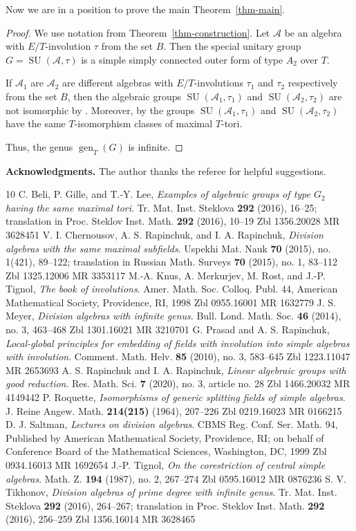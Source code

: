 \documentclass[10pt]{article}
\theoremstyle{definition}
\DeclareMathOperator{\SU}{SU}
\DeclareMathOperator{\gen}{gen}
\newcommand{\A}{\mathcal A}
\newcommand{\sourcepage}[1]{\label{source-page-#1}}
\begin{document}
Now we are in a position to prove the main Theorem~\ref{thm-main}.
\begin{proof}
We use notation from Theorem~\ref{thm-construction}. Let $\A$ be an algebra with $E/T$-involution $\tau$ from the set $B$. Then the special unitary group $G=\SU(\A,\tau)$ is a simple simply connected outer form of type $A_2$ over $T$.

If $\A_1$ are $\A_2$ are different algebras with $E/T$-involutions $\tau_1$ and $\tau_2$ respectively from the set $B$, then the algebraic groups $\SU(\A_1,\tau_1)$ and $\SU(\A_2,\tau_2)$ are not isomorphic by \cite[Th. 26.9]{r3}. Moreover, by \cite[Prop. 2.3]{r5} the groups $\SU(\A_1,\tau_1)$ and $\SU(\A_2,\tau_2)$ have the same $T$-isomorphism classes of maximal $T$-tori.

Thus, the genus $\gen_T(G)$ is infinite.
\end{proof}
\noindent\textbf{Acknowledgments.} The author thanks the referee for helpful suggestions.
\begin{thebibliography}{10}
 C. Beli, P. Gille, and T.-Y. Lee, \textit{Examples of algebraic groups of type $G_2$ having the same maximal tori}. Tr. Mat. Inst. Steklova \textbf{292} (2016), 16--25; translation in Proc. Steklov Inst. Math. \textbf{292} (2016), 10--19 Zbl 1356.20028 MR 3628451
 V. I. Chernousov, A. S. Rapinchuk, and I. A. Rapinchuk, \textit{Division algebras with the same maximal subfields}. Uspekhi Mat. Nauk \textbf{70} (2015), no. 1(421), 89--122; translation in Russian Math. Surveys \textbf{70} (2015), no. 1, 83--112 Zbl 1325.12006 MR 3353117
\newpage
\sourcepage{10}
 M.-A. Knus, A. Merkurjev, M. Rost, and J.-P. Tignol, \textit{The book of involutions}. Amer. Math. Soc. Colloq. Publ. 44, American Mathematical Society, Providence, RI, 1998 Zbl 0955.16001 MR 1632779
 J. S. Meyer, \textit{Division algebras with infinite genus}. Bull. Lond. Math. Soc. \textbf{46} (2014), no. 3, 463--468 Zbl 1301.16021 MR 3210701
 G. Prasad and A. S. Rapinchuk, \textit{Local-global principles for embedding of fields with involution into simple algebras with involution}. Comment. Math. Helv. \textbf{85} (2010), no. 3, 583--645 Zbl 1223.11047 MR 2653693
 A. S. Rapinchuk and I. A. Rapinchuk, \textit{Linear algebraic groups with good reduction}. Res. Math. Sci. \textbf{7} (2020), no. 3, article no. 28 Zbl 1466.20032 MR 4149442
 P. Roquette, \textit{Isomorphisms of generic splitting fields of simple algebras}. J. Reine Angew. Math. \textbf{214(215)} (1964), 207--226 Zbl 0219.16023 MR 0166215
 D. J. Saltman, \textit{Lectures on division algebras}. CBMS Reg. Conf. Ser. Math. 94, Published by American Mathematical Society, Providence, RI; on behalf of Conference Board of the Mathematical Sciences, Washington, DC, 1999 Zbl 0934.16013 MR 1692654
 J.-P. Tignol, \textit{On the corestriction of central simple algebras}. Math. Z. \textbf{194} (1987), no. 2, 267--274 Zbl 0595.16012 MR 0876236
 S. V. Tikhonov, \textit{Division algebras of prime degree with infinite genus}. Tr. Mat. Inst. Steklova \textbf{292} (2016), 264--267; translation in Proc. Steklov Inst. Math. \textbf{292} (2016), 256--259 Zbl 1356.16014 MR 3628465
\end{thebibliography}
\end{document}

